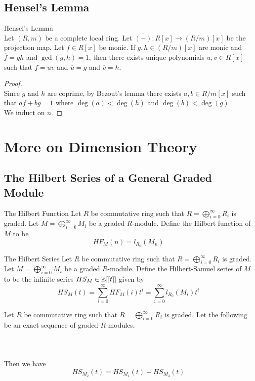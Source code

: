 \documentclass[a4paper]{article}
\begin{document}
\subsection{Hensel's Lemma}
\begin{thm}{Hensel's Lemma}{}\\
Let $(R,m)$ be a complete local ring. Let $\overline{(-)}:R[x]\to(R/m)[x]$ be the projection map. Let $f\in R[x]$ be monic. If $g,h\in(R/m)[x]$ are monic and $\overline{f}=gh$ and $\gcd(g,h)=1$, then there exists unique polynomials $u,v\in R[x]$ such that $f=uv$ and $\overline{u}=g$ and $\overline{v}=h$. 
\begin{proof}\\
Since $g$ and $h$ are coprime, by Bezout's lemma there exists $a,b\in R/m[x]$ such that $af+bg=1$ where $\deg(a)<\deg(h)$ and $\deg(b)<\deg(g)$. \\

We induct on $n$. 
\end{proof}
\end{thm}

\pagebreak
\section{More on Dimension Theory}
\subsection{The Hilbert Series of a General Graded Module}
\begin{defn}{The Hilbert Function}{} Let $R$ be commutative ring such that $R=\bigoplus_{i=0}^\infty R_i$ is graded. Let $M=\bigoplus_{i=0}^\infty M_i$ be a graded $R$-module. Define the Hilbert function of $M$ to be $$HF_M(n)=l_{R_0}(M_n)$$
\end{defn}

\begin{defn}{The Hilbert Series}{} Let $R$ be commutative ring such that $R=\bigoplus_{i=0}^\infty R_i$ is graded. Let $M=\bigoplus_{i=0}^\infty M_i$ be a graded $R$-module. Define the Hilbert-Samuel series of $M$ to be the infinite series $HS_M\in\mathbb{Z}[[t]]$ given by $$HS_M(t)=\sum_{i=0}^\infty HF_M(i)t^i=\sum_{i=0}^\infty l_{R_0}(M_i)t^i$$
\end{defn}

\begin{prp}{}{} Let $R$ be commutative ring such that $R=\bigoplus_{i=0}^\infty R_i$ is graded. Let the following be an exact sequence of graded $R$-modules. \\~\\
\\~\\
Then we have $$HS_{M_2}(t)=HS_{M_1}(t)+HS_{M_3}(t)$$
\end{prp}
\end{document}

